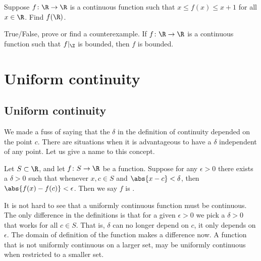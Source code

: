 \documentclass[12pt]{book}
\begin{document}
\begin{exercise}
Suppose $f \colon \R \to \R$ is a continuous function such that
$x \leq f(x) \leq x+1$ for all $x \in \R$.
Find $f(\R)$.
\end{exercise}

\begin{exercise}
True/False, prove or find a counterexample.
If $f \colon \R \to
\R$ is a continuous function such that $f|_{\Z}$ is bounded, then $f$
is bounded.
\end{exercise}


\sectionnewpage
\section{Uniform continuity}
\label{sec:unifcont}


\subsection*{Uniform continuity}

We made a fuss of saying that the $\delta$ in the definition of
continuity depended on the point $c$.
There are situations when it is
advantageous to have a $\delta$ independent of any point.
Let
us give a name to this concept.

\begin{defn}
Let $S \subset \R$, and let $f \colon S \to \R$ be a function.
Suppose for any $\epsilon > 0$ there exists a $\delta > 0$
such that whenever $x, c \in S$ and
$\abs{x-c} < \delta$, then $\abs{f(x)-f(c)} < \epsilon$.
Then we say $f$ is \emph{}.
\end{defn}

It is not hard to see that a uniformly continuous function
must be continuous.
The only difference in the definitions
is that for a given $\epsilon > 0$ we pick a $\delta > 0$ that
works for all $c \in S$.
That is, $\delta$ can no longer depend on $c$,
it only depends on $\epsilon$.
The domain of definition
of the function makes a difference now.
A function that is not uniformly
continuous on a larger set, may be uniformly continuous when restricted to a
smaller set.
\end{document}
